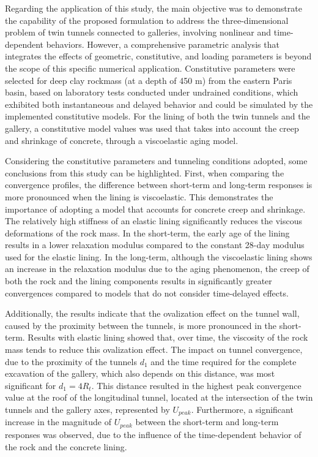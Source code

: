 \documentclass[a4paper,fleqn]{cas-sc}
\begin{document}
Regarding the application of this study, the main objective was to demonstrate the capability of the proposed formulation to address the three-dimensional problem of twin tunnels connected to galleries, involving nonlinear and time-dependent behaviors. However, a comprehensive parametric analysis that integrates the effects of geometric, constitutive, and loading parameters is beyond the scope of this specific numerical application. Constitutive parameters were selected for deep clay rockmass (at a depth of 450 m) from the eastern Paris basin, based on laboratory tests conducted under undrained conditions, which exhibited both instantaneous and delayed behavior and could be simulated by the implemented constitutive models. For the lining of both the twin tunnels and the gallery, a constitutive model values was used that takes into account the creep and shrinkage of concrete, through a viscoelastic aging model.

Considering the constitutive parameters and tunneling conditions adopted, some conclusions from this study can be highlighted. First, when comparing the convergence profiles, the difference between short-term and long-term responses is more pronounced when the lining is viscoelastic. This demonstrates the importance of adopting a model that accounts for concrete creep and shrinkage. The relatively high stiffness of an elastic lining significantly reduces the viscous deformations of the rock mass. In the short-term, the early age of the lining results in a lower relaxation modulus compared to the constant 28-day modulus used for the elastic lining. In the long-term, although the viscoelastic lining shows an increase in the relaxation modulus due to the aging phenomenon, the creep of both the rock and the lining components results in significantly greater convergences compared to models that do not consider time-delayed effects.

Additionally, the results indicate that the ovalization effect on the tunnel wall, caused by the proximity between the tunnels, is more pronounced in the short-term. Results with elastic lining showed that, over time, the viscosity of the rock mass tends to reduce this ovalization effect. The impact on tunnel convergence, due to the proximity of the tunnels $d_1$ and the time required for the complete excavation of the gallery, which also depends on this distance, was most significant for $d_1 = 4R_t$. This distance resulted in the highest peak convergence value at the roof of the longitudinal tunnel, located at the intersection of the twin tunnels and the gallery axes, represented by $U_{peak}$. Furthermore, a significant increase in the magnitude of $U_{peak}$ between the short-term and long-term responses was observed, due to the influence of the time-dependent behavior of the rock and the concrete lining.
\end{document}
